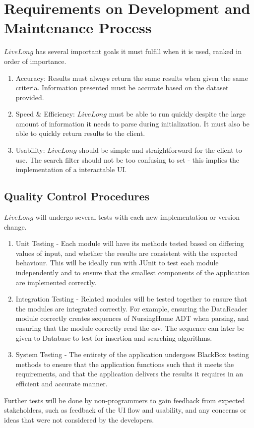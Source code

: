 \documentclass[12pt]{article}
\begin{document}
\newpage
\section{Requirements on Development and Maintenance Process}
$LiveLong$ has several important goals it must fulfill when it is used, ranked in order of importance.
\begin{enumerate}
\item Accuracy: Results must always return the same results when given the same criteria. Information presented must be accurate based on the dataset provided.
\item Speed \& Efficiency: $LiveLong$ must be able to run quickly despite the large amount of information it needs to parse during initialization. It must also be able to quickly return results to the client. 
\item Usability: $LiveLong$ should be simple and straightforward for the client to use. The search filter should not be too confusing to set - this implies the implementation of a interactable UI.
\end{enumerate}
\subsection{Quality Control Procedures}
$LiveLong$ will undergo several tests with each new implementation or version change.
\begin{enumerate}
\item Unit Testing - Each module will have its methods tested based on differing values of input, and whether the results are consistent with the expected behaviour. This will be ideally run with JUnit to test each module independently and to ensure that the smallest components of the application are implemented correctly.
\item Integration Testing - Related modules will be tested together to ensure that the modules are integrated correctly. For example, ensuring the DataReader module correctly creates sequences of NursingHome ADT when parsing, and ensuring that the module correctly read the csv. The sequence can later be given to Database to test for insertion and searching algorithms.
\item System Testing - The entirety of the application undergoes BlackBox testing methods to ensure that the application functions such that it meets the requirements, and that the application delivers the results it requires in an efficient and accurate manner. 
\end{enumerate}
Further tests will be done by non-programmers to gain feedback from expected stakeholders, such as feedback of the UI flow and usability, and any concerns or ideas that were not considered by the developers.
\end{document}
